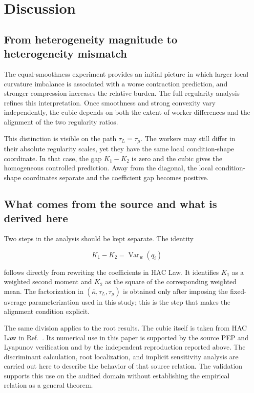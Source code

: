 \section{Discussion}

\subsection{From heterogeneity magnitude to heterogeneity mismatch}

The equal-smoothness experiment provides an initial picture in which larger local curvature imbalance is associated with a worse contraction prediction, and stronger compression increases the relative burden. The full-regularity analysis refines this interpretation. Once smoothness and strong convexity vary independently, the cubic depends on both the extent of worker differences and the alignment of the two regularity ratios.

This distinction is visible on the path $\tau_L=\tau_\mu$. The workers may still differ in their absolute regularity scales, yet they have the same local condition-shape coordinate. In that case, the gap $K_1-K_2$ is zero and the cubic gives the homogeneous controlled prediction. Away from the diagonal, the local condition-shape coordinates separate and the coefficient gap becomes positive.

\subsection{What comes from the source and what is derived here}

Two steps in the analysis should be kept separate. The identity

\[
K_1-K_2=\operatorname{Var}_w(q_i)
\]

follows directly from rewriting the coefficients in HAC Law. It identifies $K_1$ as a weighted second moment and $K_2$ as the square of the corresponding weighted mean. The factorization in $(\bar{\kappa},\tau_L,\tau_\mu)$ is obtained only after imposing the fixed-average parameterization used in this study; this is the step that makes the alignment condition explicit.

The same division applies to the root results. The cubic itself is taken from HAC Law in Ref.~\cite{thomsen2026tight}. Its numerical use in this paper is supported by the source PEP and Lyapunov verification and by the independent reproduction reported above. The discriminant calculation, root localization, and implicit sensitivity analysis are carried out here to describe the behavior of that source relation. The validation supports this use on the audited domain without establishing the empirical relation as a general theorem.

